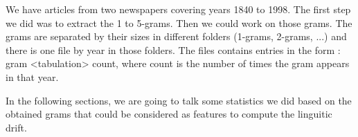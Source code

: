 We have articles from two newspapers covering years 1840 to 1998. The first step we did was to extract the 1 to 5-grams. Then we could work on those grams. The grams are separated by their sizes in different folders (1-grams, 2-grams, ...) and there is one file by year in those folders. The files contains entries in the form : gram <tabulation> count, where count is the number of times the gram appears in that year.

In the following sections, we are going to talk some statistics we did based on the obtained grams that could be considered as features to compute the linguitic drift.
